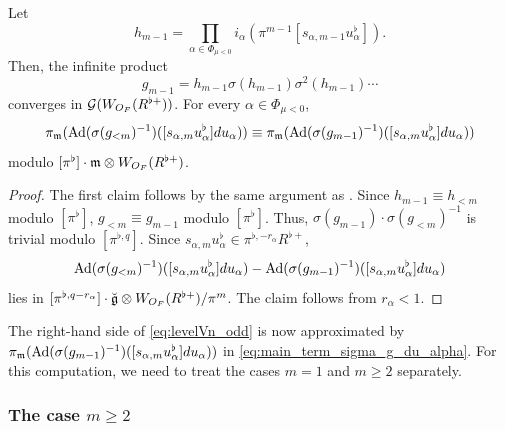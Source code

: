 \documentclass[12pt,reqno]{amsart}
\begin{document}

\begin{lem} \label{lem:redtoh_odd}
    Let 
    \[
        h_{m-1} = \prod_{\alpha \in \Phi_{\mu<0}} i_\alpha(\pi^{m-1}[s_{\alpha,m-1}u_\alpha^\flat]). 
    \]
    Then, the infinite product
    \[
        g_{m-1} = h_{m-1} \sigma(h_{m-1}) \sigma^2(h_{m-1}) \cdots
    \]
    converges in ${\mathcal{G}}(W_{O_F}(R^{\flat+}))$. For every $\alpha \in \Phi_{\mu<0}$, 
    \begin{equation} \label{eq:main_term_sigma_g_du_alpha}
        \pi_{{\mathfrak{m}}}({\operatorname{Ad}}(\sigma(g_{<m})^{-1})([s_{\alpha,m}u_\alpha^\flat]du_\alpha)) \equiv \pi_{{\mathfrak{m}}}({\operatorname{Ad}}(\sigma(g_{m-1})^{-1})([s_{\alpha,m}u_\alpha^\flat]du_\alpha))
    \end{equation}
    modulo $[\pi^{\flat}]\cdot {\mathfrak{m}} \otimes W_{O_F}(R^{\flat+})$. 
\end{lem}
\begin{proof}
    The first claim follows by the same argument as . Since $h_{m-1}\equiv h_{< m}$ modulo $[\pi^{\flat}]$, $g_{<m} \equiv g_{m-1}$ modulo $[\pi^{\flat}]$. Thus, $\sigma(g_{m-1}) \cdot \sigma(g_{<m})^{-1}$ is trivial modulo $[\pi^{\flat, q}]$. Since $s_{\alpha,m}u_\alpha^\flat \in \pi^{\flat, - r_{\alpha}} R^{\flat+}$, 
    \[
        {\operatorname{Ad}}(\sigma(g_{<m})^{-1})([s_{\alpha,m}u_\alpha^\flat]du_\alpha) - {\operatorname{Ad}}(\sigma(g_{m-1})^{-1})([s_{\alpha,m}u_\alpha^\flat]du_\alpha)
    \]
    lies in $[\pi^{\flat, q - r_{\alpha}}] \cdot {\mathfrak{\breve{g}}} \otimes W_{O_F}(R^{\flat+})/\pi^{m}$. The claim follows from $r_{\alpha} < 1$. 
\end{proof}

The right-hand side of \eqref{eq:levelVn_odd} is now approximated by $\pi_{{\mathfrak{m}}}({\operatorname{Ad}}(\sigma(g_{m-1})^{-1})([s_{\alpha,m}u_\alpha^\flat]du_\alpha))$ in \eqref{eq:main_term_sigma_g_du_alpha}. For this computation, we need to treat the cases $m = 1$ and $m \geq 2$ separately. 

\subsubsection{The case $m \geq 2$}
\end{document}
